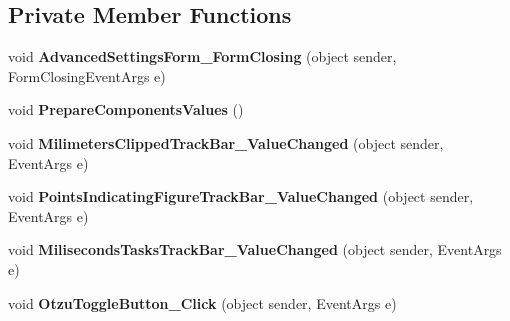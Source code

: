 \subsection*{Private Member Functions}
\begin{DoxyCompactItemize}
\item 
\mbox{\label{class_chess_tracking_1_1_user_interface_1_1_advanced_settings_form_a11d5a83df3d540aad8212ba4fa4f4e0c}} 
void {\bfseries Advanced\+Settings\+Form\+\_\+\+Form\+Closing} (object sender, Form\+Closing\+Event\+Args e)
\item 
\mbox{\label{class_chess_tracking_1_1_user_interface_1_1_advanced_settings_form_af5c00bc5f8a66f9f664cea1f88c3f56d}} 
void {\bfseries Prepare\+Components\+Values} ()
\item 
\mbox{\label{class_chess_tracking_1_1_user_interface_1_1_advanced_settings_form_a69dbcf8650e96c09bbf1b66462056a8f}} 
void {\bfseries Milimeters\+Clipped\+Track\+Bar\+\_\+\+Value\+Changed} (object sender, Event\+Args e)
\item 
\mbox{\label{class_chess_tracking_1_1_user_interface_1_1_advanced_settings_form_a85c780d8c44fcb627bc509c35cde131f}} 
void {\bfseries Points\+Indicating\+Figure\+Track\+Bar\+\_\+\+Value\+Changed} (object sender, Event\+Args e)
\item 
\mbox{\label{class_chess_tracking_1_1_user_interface_1_1_advanced_settings_form_af668dd5894df7b005b04f9a8e04d6b97}} 
void {\bfseries Miliseconds\+Tasks\+Track\+Bar\+\_\+\+Value\+Changed} (object sender, Event\+Args e)
\item 
\mbox{\label{class_chess_tracking_1_1_user_interface_1_1_advanced_settings_form_a061b454451fbdeaf4a8e1838f031830f}} 
void {\bfseries Otzu\+Toggle\+Button\+\_\+\+Click} (object sender, Event\+Args e)
\item 
\mbox{\label{class_chess_tracking_1_1_user_interface_1_1_advanced_settings_form_a2eb70f1ff0e6b7e340d42f409b6a4413}} 

\end{DoxyCompactItemize}
